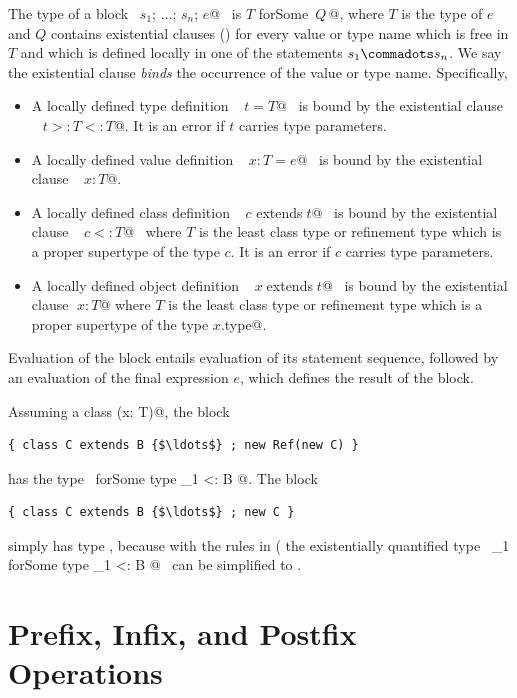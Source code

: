 The type of a block ~\lstinline@$s_1$; $\ldots$; $s_n$; $e$@~ is
\lstinline@$T$ forSome {$\,Q\,$}@, where $T$ is the type of $e$ and $Q$ 
contains existential clauses ()
for every value or type name which is free in $T$ 
and which is defined locally in one of the statements $s_1 \commadots s_n$.
We say the existential clause {\em binds} the occurrence of the value or type name.
Specifically, 
\begin{itemize}
\item
A locally defined type definition  ~\lstinline@type$\;t = T$@~
is bound by the existential clause ~\lstinline@type$\;t >: T <: T$@.
It is an error if $t$ carries type parameters. 
\item
A locally defined value definition~ \lstinline@val$\;x: T = e$@~ is
bound by the existential clause ~\lstinline@val$\;x: T$@.
\item
A locally defined class definition ~\lstinline@class$\;c$ extends$\;t$@~
is bound by the existential clause ~\lstinline@type$\;c <: T$@~ where
$T$ is the least class type or refinement type which is a proper
supertype of the type $c$. It is an error if $c$ carries type parameters. 
\item
A locally defined object definition ~\lstinline@object$\;x\;$extends$\;t$@~
is bound by the existential clause \lstinline@val$\;x: T$@ where
$T$ is the least class type or refinement type which is a proper supertype of the type 
\lstinline@$x$.type@.
\end{itemize}
Evaluation of the block entails evaluation of its
statement sequence, followed by an evaluation of the final expression
$e$, which defines the result of the block.

\example
Assuming a class \lstinline@Ref[T](x: T)@, the block
\begin{lstlisting}
{ class C extends B {$\ldots$} ; new Ref(new C) }
\end{lstlisting}
has the type ~\lstinline@Ref[_1] forSome { type _1 <: B }@.
The block
\begin{lstlisting}
{ class C extends B {$\ldots$} ; new C }
\end{lstlisting}
simply has type , because with the rules in
( the existentially quantified type 
~\lstinline@_1 forSome { type _1 <: B }@~ can be simplified to .


\section{Prefix, Infix, and Postfix Operations}
\label{sec:infix-operations}

